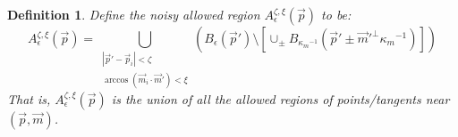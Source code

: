 \documentclass{article}
\newtheorem{definition}[cntr]{Definition}
\numberwithin{cntr}{section}
\numberwithin{equation}{section}
\newcommand{\abs}[1]{\left| #1 \right|}%
\newcommand{\vp}[0]{{\vec{p}}}
\newcommand{\vm}[0]{{\vec{m}}}
\newcommand{\ball}[2]{ { B_{#1}(#2) } }
\newcommand{\curvemax}{{\kappa_{m}}}
\newcommand{\curvemaxi}{{\curvemax^{-1}}}
\newcommand{\pointNoise}{{\zeta}}
\newcommand{\tanNoise}{{\xi}}
\newcommand{\nallowed}[2]{ { A^{\pointNoise, \tanNoise}_{#1}(#2) } }
\begin{document}
\begin{definition}
  \label{def:AllowedRegionNoisy}
  Define the \emph{noisy allowed region} $\nallowed{\epsilon}{\vp}$ to be:
  \begin{equation}
    \label{eq:allowedRegionNoisy}
    \nallowed{\epsilon}{\vp}= \bigcup_{
      \substack{
        \abs{\vp'-\vp_{i}} < \pointNoise\\
        \arccos(\vm_{i} \cdot \vm') < \tanNoise
      }
    }
    \left(
      \ball{\epsilon}{\vp'} \setminus \left[ \cup_{\pm} \ball{\curvemaxi}{\vp' \pm \vm'^{\perp} \curvemaxi} \right]
    \right)
  \end{equation}
  That is, $\nallowed{\epsilon}{\vp}$ is the union of all the allowed regions of points/tangents near $(\vp, \vm)$.
\end{definition}
\end{document}
